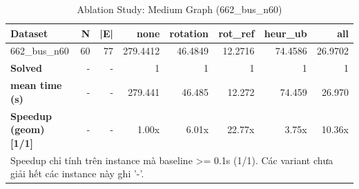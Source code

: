 \begin{table}[htbp]
\centering
\caption{Ablation Study: Medium Graph (662_bus_n60)}
\label{tab:table_ablation_medium}
\begin{tabular}{lrrrrrrr}
\toprule
Dataset & N & |E| & none & rotation & rot\_ref & heur\_ub & all \\
\midrule
662\_bus\_n60 & 60 & 77 & 279.4412 & 46.4849 & 12.2716 & 74.4586 & 26.9702 \\
\midrule
\textbf{Solved} & - & - & 1 & 1 & 1 & 1 & 1 \\
\textbf{mean time (s)} & - & - & 279.441 & 46.485 & 12.272 & 74.459 & 26.970 \\
\textbf{Speedup (geom) [1/1]} & - & - & 1.00x & 6.01x & 22.77x & 3.75x & 10.36x \\
\bottomrule
\multicolumn{8}{l}{\footnotesize Speedup chỉ tính trên instance mà baseline >= 0.1s (1/1). Các variant chưa giải hết các instance này ghi '-'.} \\
\end{tabular}
\end{table}
